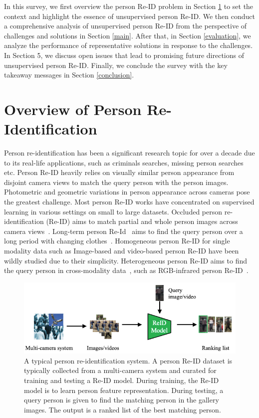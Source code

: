 \documentclass[a4paper,fleqn]{cas-dc}
\begin{document}
In this survey, we first overview the person Re-ID problem in Section \ref{overview} to set the context and highlight the essence of unsupervised person Re-ID. We then conduct a comprehensive analysis of unsupervised person Re-ID from the perspective of challenges and solutions in Section \ref{main}. After that, in Section \ref{evaluation}, we analyze the performance of representative solutions in response to the challenges. In Section 5, we discuss open issues that lead to promising future directions of unsupervised person Re-ID. Finally, we conclude the survey with the key takeaway messages in Section \ref{conclusion}.

\section{Overview of Person Re-Identification}\label{overview}

Person re-identification has been a significant research topic for over a decade due to its real-life applications, such as criminals searches, missing person searches etc. Person Re-ID heavily relies on visually similar person appearance from disjoint camera views to match the query person with the person images. Photometric and geometric variations in person appearance across cameras pose the greatest challenge. Most person Re-ID works have concentrated on supervised learning in various settings on small to large datasets. Occluded person re-identification (Re-ID) aims to match partial and whole person images across camera views~\cite{wang_high-order_2020,gao_pose-guided_2020,miao_pose-guided_2019,huang_adversarially_2018,vedaldi_guided_2020}. Long-term person Re-Id~\cite{qian_long-term_2020} aims to find the query person over a long period with changing clothes~\cite{qian_long-term_2020}. Homogeneous person Re-ID for single modality data such as Image-based and video-based person Re-ID have been wildly studied due to their simplicity. Heterogeneous person Re-ID aims to find the query person in cross-modality data~\cite{choi_hi-cmd_2020,lu_cross-modality_2020}, such as RGB-infrared person Re-ID~\cite{wu_rgb-infrared_2017}.  

\begin{figure}[t]
\begin{center}
\includegraphics [width=.75\linewidth]{preid.PNG}
\end{center}
  \caption{ A typical person re-identification system. A person Re-ID dataset is typically collected from a multi-camera system and curated for training and testing a Re-ID model. During training, the Re-ID model is to learn person feature representation. During testing, a query person is given to find the matching person in the gallery images. The output is a ranked list of the best matching person.}
\label{fig:overview}
\end{figure}
\end{document}
